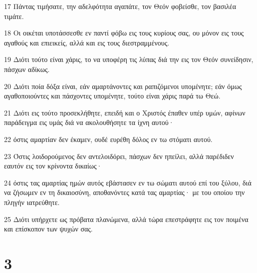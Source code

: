 \par 17 Πάντας τιμήσατε, την αδελφότητα αγαπάτε, τον Θεόν φοβείσθε, τον βασιλέα τιμάτε.
\par 18 Οι οικέται υποτάσσεσθε εν παντί φόβω εις τους κυρίους σας, ου μόνον εις τους αγαθούς και επιεικείς, αλλά και εις τους διεστραμμένους.
\par 19 Διότι τούτο είναι χάρις, το να υποφέρη τις λύπας διά την εις τον Θεόν συνείδησιν, πάσχων αδίκως.
\par 20 Διότι ποία δόξα είναι, εάν αμαρτάνοντες και ραπιζόμενοι υπομένητε; εάν όμως αγαθοποιούντες και πάσχοντες υπομένητε, τούτο είναι χάρις παρά τω Θεώ.
\par 21 Διότι εις τούτο προσεκλήθητε, επειδή και ο Χριστός έπαθεν υπέρ υμών, αφίνων παράδειγμα εις υμάς διά να ακολουθήσητε τα ίχνη αυτού·
\par 22 όστις αμαρτίαν δεν έκαμεν, ουδέ ευρέθη δόλος εν τω στόματι αυτού.
\par 23 Όστις λοιδορούμενος δεν αντελοιδόρει, πάσχων δεν ηπείλει, αλλά παρέδιδεν εαυτόν εις τον κρίνοντα δικαίως·
\par 24 όστις τας αμαρτίας ημών αυτός εβάστασεν εν τω σώματι αυτού επί του ξύλου, διά να ζήσωμεν εν τη δικαιοσύνη, αποθανόντες κατά τας αμαρτίας· με του οποίου την πληγήν ιατρεύθητε.
\par 25 Διότι υπήρχετε ως πρόβατα πλανώμενα, αλλά τώρα επεστράφητε εις τον ποιμένα και επίσκοπον των ψυχών σας.

\chapter{3}

